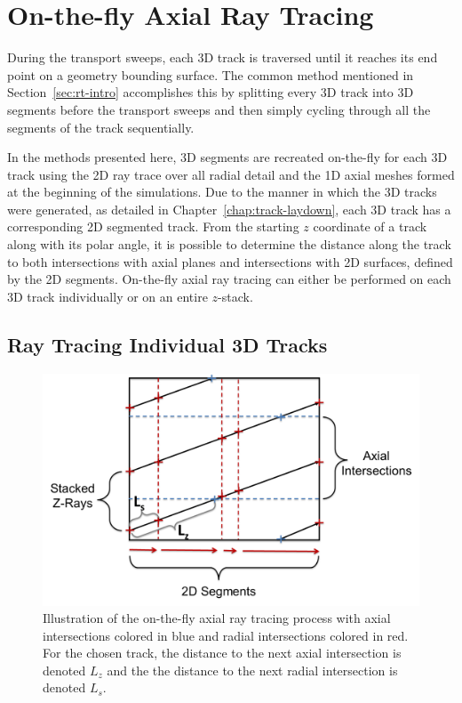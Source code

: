 \section{On-the-fly Axial Ray Tracing}

During the transport sweeps, each 3D track is traversed until it reaches its end point on a geometry bounding surface. The common method mentioned in Section~\ref{sec:rt-intro} accomplishes this by splitting every 3D track into 3D segments before the transport sweeps and then simply cycling through all the segments of the track sequentially.

In the methods presented here, 3D segments are recreated on-the-fly for each 3D track using the 2D ray trace over all radial detail and the 1D axial meshes formed at the beginning of the simulations. Due to the manner in which the 3D tracks were generated, as detailed in Chapter~\ref{chap:track-laydown}, each 3D track has a corresponding 2D segmented track. From the starting $z$ coordinate of a track along with its polar angle, it is possible to determine the distance along the track to both intersections with axial planes and intersections with 2D surfaces, defined by the 2D segments. On-the-fly axial ray tracing can either be performed on each 3D track individually or on an entire $z$-stack.

\subsection{Ray Tracing Individual 3D Tracks}

\begin{figure}[ht!]
	\centering
	\includegraphics[width=0.75\linewidth]{figures/ph2016/otf_ray_tracing.png}
	\caption{Illustration of the on-the-fly axial ray tracing process with axial intersections colored in blue and radial intersections colored in red. For the chosen track, the distance to the next axial intersection is denoted $L_z$ and the the distance to the next radial intersection is denoted $L_s$.}
	\label{fig::otf_ray_tracing}
\end{figure}

